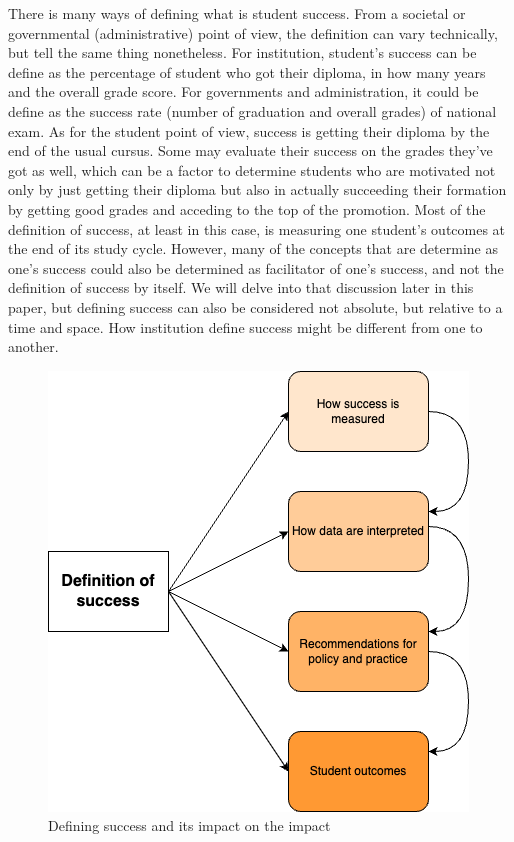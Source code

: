 \documentclass[../../main.tex]{subfiles}
\begin{document}
There is many ways of defining what is student success. From a societal or governmental (administrative) point of view, the definition can vary technically, but tell the same thing nonetheless. For institution, student's success can be define as the percentage of student who got their diploma, in how many years and the overall grade score. For governments and administration, it could be define as the success rate (number of graduation and overall grades) of national exam. As for the student point of view, success is getting their diploma by the end of the usual cursus. Some may evaluate their success on the grades they've got as well, which can be a factor to determine students who are motivated not only by just getting their diploma but also in actually succeeding their formation by getting good grades and acceding to the top of the promotion.
Most of the definition of success, at least in this case, is measuring one student's outcomes at the end of its study cycle. However, many of the concepts that are determine as one's success could also be determined as facilitator of one's success, and not the definition of success by itself.
We will delve into that discussion later in this paper, but defining success can also be considered not absolute, but relative to a time and space. How institution define success might be different from one to another.\cite{weatherton_success_2021}
\begin{figure}
    \centering
    \includegraphics[width=1\linewidth]{res//diagram/sucess-definition-graph.png}
    \caption{Defining success and its impact on the impact\cite{weatherton_success_2021}}
    \label{fig:success_impact}
\end{figure}
\end{document}
